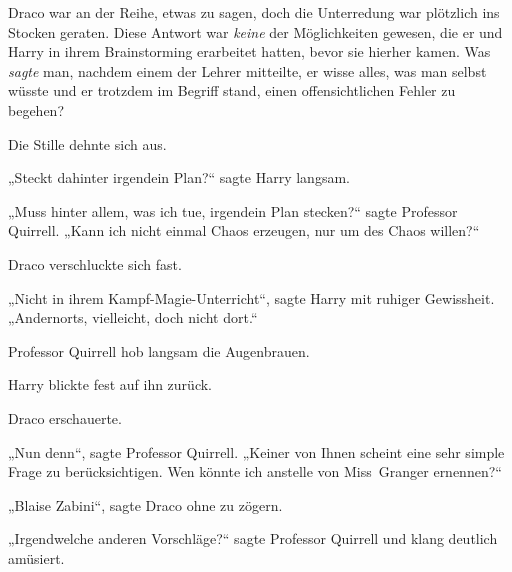 Draco war an der Reihe, etwas zu sagen, doch die Unterredung war plötzlich ins Stocken geraten. Diese Antwort war \emph{keine} der Möglichkeiten gewesen, die er und Harry in ihrem Brainstorming erarbeitet hatten, bevor sie hierher kamen. Was \emph{sagte} man, nachdem einem der Lehrer mitteilte, er wisse alles, was man selbst wüsste und er trotzdem im Begriff stand, einen offensichtlichen Fehler zu begehen?

Die Stille dehnte sich aus.

„Steckt dahinter irgendein Plan?“ sagte Harry langsam.

„Muss hinter allem, was ich tue, irgendein Plan stecken?“ sagte Professor Quirrell. „Kann ich nicht einmal Chaos erzeugen, nur um des Chaos willen?“

Draco verschluckte sich fast.

„Nicht in ihrem Kampf-Magie-Unterricht“, sagte Harry mit ruhiger Gewissheit. „Andernorts, vielleicht, doch nicht dort.“

Professor Quirrell hob langsam die Augenbrauen.

Harry blickte fest auf ihn zurück.

Draco erschauerte.

„Nun denn“, sagte Professor Quirrell. „Keiner von Ihnen scheint eine sehr simple Frage zu berücksichtigen. Wen könnte ich anstelle von Miss~Granger ernennen?“

„Blaise Zabini“, sagte Draco ohne zu zögern.

„Irgendwelche anderen Vorschläge?“ sagte Professor Quirrell und klang deutlich amüsiert.

